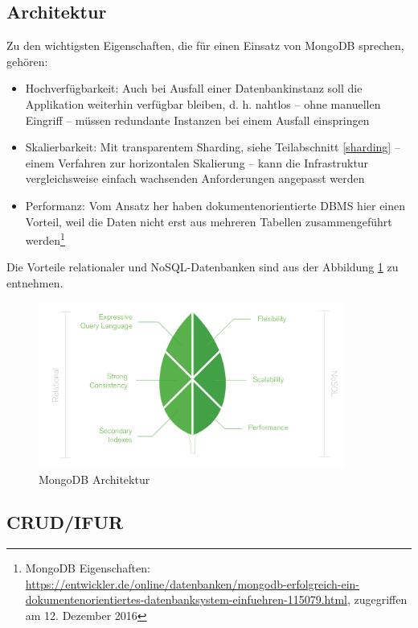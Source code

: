 \subsection{Architektur}
Zu den wichtigsten Eigenschaften, die für einen Einsatz von MongoDB sprechen, gehören:
\begin{itemize}
\item Hochverfügbarkeit: Auch bei Ausfall einer Datenbankinstanz soll die Applikation weiterhin verfügbar bleiben, d. h. nahtlos – ohne manuellen Eingriff – müssen redundante Instanzen bei einem Ausfall einspringen
\item Skalierbarkeit: Mit transparentem Sharding, siehe Teilabschnitt \ref{sharding} – einem Verfahren zur horizontalen Skalierung – kann die Infrastruktur vergleichsweise einfach wachsenden Anforderungen angepasst werden
\item Performanz: Vom Ansatz her haben dokumentenorientierte DBMS hier einen Vorteil, weil die Daten nicht erst aus mehreren Tabellen zusammengeführt werden\footnote{MongoDB Eigenschaften: \url{https://entwickler.de/online/datenbanken/mongodb-erfolgreich-ein-dokumentenorientiertes-datenbanksystem-einfuehren-115079.html}, zugegriffen am 12. Dezember 2016}
\end{itemize}

Die Vorteile relationaler und NoSQL-Datenbanken sind aus der Abbildung \ref{img:architektur} zu entnehmen.
\begin{figure}[H]
\centering
\includegraphics[width=0.9\textwidth]{resources/architectureNoSQLVSRelational}
\caption[MongoDB Architektur]{MongoDB Architektur\protect\footnotemark}
\label{img:architektur}
\end{figure}

\subsection{CRUD/IFUR}\label{ifur}
